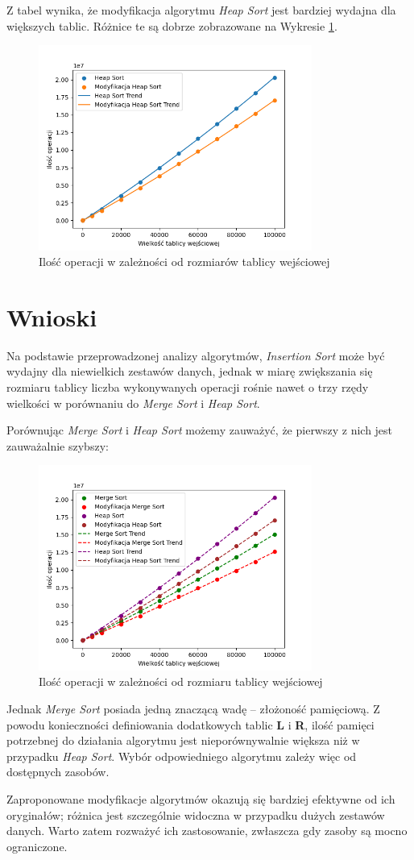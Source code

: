 \documentclass{article}
\begin{document}
Z tabel wynika, że modyfikacja algorytmu \textit{Heap Sort} jest bardziej wydajna dla większych tablic. Różnice te są dobrze zobrazowane na Wykresie \ref{fig:heap}.

\begin{figure}[H]
    \centering
    \includegraphics[width=0.8\textwidth]{Figure_3.png}
    \caption{Ilość operacji w zależności od rozmiarów tablicy wejściowej}
    \label{fig:heap}
\end{figure}
\section{Wnioski}
Na podstawie przeprowadzonej analizy algorytmów, \textit{Insertion Sort} może być wydajny dla niewielkich zestawów danych, jednak w miarę zwiększania się rozmiaru tablicy liczba wykonywanych operacji rośnie nawet o trzy rzędy wielkości w porównaniu do \textit{Merge Sort} i \textit{Heap Sort}.

Porównując \textit{Merge Sort} i \textit{Heap Sort} możemy zauważyć, że pierwszy z nich jest zauważalnie szybszy:
\begin{figure}[H]
    \centering
    \includegraphics[width=0.8\textwidth]{Figure_4.png}
    \caption{Ilość operacji w zależności od rozmiaru tablicy wejściowej}
    \label{fig:heapmerge}
\end{figure}
Jednak \textit{Merge Sort} posiada jedną znaczącą wadę – złożoność pamięciową. Z powodu konieczności definiowania dodatkowych tablic \textbf{L} i \textbf{R}, ilość pamięci potrzebnej do działania algorytmu jest nieporównywalnie większa niż w przypadku \textit{Heap Sort}. Wybór odpowiedniego algorytmu zależy więc od dostępnych zasobów.

Zaproponowane modyfikacje algorytmów okazują się bardziej efektywne od ich oryginałów; różnica jest szczególnie widoczna w przypadku dużych zestawów danych. Warto zatem rozważyć ich zastosowanie, zwłaszcza gdy zasoby są mocno ograniczone.
\end{document}

